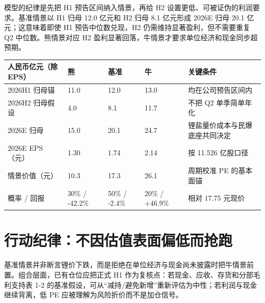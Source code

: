 模型的纪律是先把 H1 预告区间纳入情景，再给 H2 设置更低、可被证伪的利润要求。基准情景以 H1 归母 12.0 亿元和 H2 归母 8.1 亿元形成 2026E 归母 20.1 亿元；这意味着即使 H1 预告中位数兑现，H2 仍需维持显著盈利，但不需要重复 Q2 中位数。熊情景对应 H2 盈利显著回落，牛情景才要求单位经济和现金同步超预期。

\begin{exhibitbox}[表 1-2：从 H1 预告到全年盈利的情景桥]
\begin{tabularx}{\exhibitboxwidth}{L{3.4cm}R{2.2cm}R{2.2cm}R{2.2cm}X}
\toprule
人民币亿元（除 EPS） & 熊 & 基准 & 牛 & 关键条件 \\
\midrule
2026H1 归母锚 & 11.0 & 12.0 & 13.0 & 均在公司预告区间内 \\
2026H2 归母假设 & 4.0 & 8.1 & 11.7 & 不把 Q2 单季简单年化 \\
2026E 归母 & 15.0 & 20.1 & 24.7 & 锂盐量价成本与民爆底座共同决定 \\
2026E EPS（元） & 1.30 & 1.74 & 2.14 & 按 11.526 亿股口径 \\
情景价值（元） & 10.3 & 17.3 & 26.1 & 周期校准 PE 的基本面锚 \\
概率 / 回报 & 30\% / -42.2\% & 50\% / -2.4\% & 20\% / +46.9\% & 相对 17.75 元现价 \\
\bottomrule
\end{tabularx}
\end{exhibitbox}

\section{行动纪律：不因估值表面偏低而抢跑}

基准情景并非断言锂价下跌，而是拒绝在单位经济与现金尚未披露时把牛情景前置。组合层面，已有仓位应把正式 H1 作为复核点：若现金、应收、存货和分部毛利支持表 1-2 的基准假设，可从“减持/避免新增”重新评估为中性；若利润与现金继续背离，低 PE 应被理解为风险折价而不是加仓信号。
